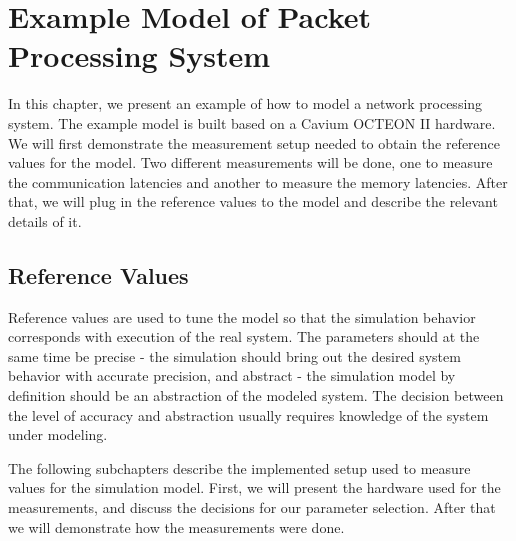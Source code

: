 \chapter{Example Model of Packet Processing System}
\label{chapter:example-simulation-model}

In this chapter, we present an example of how to model a network processing system. The example model is built based on a Cavium OCTEON II hardware. We will first demonstrate the measurement setup needed to obtain the reference values for the model. Two different measurements will be done, one to measure the communication latencies and another to measure the memory latencies. After that, we will plug in the reference values to the model and describe the relevant details of it.

\section{Reference Values}
\label{sec:reference-values}

 Reference values are used to tune the model so that the simulation behavior corresponds with execution of the real system. The parameters should at the same time be precise - the simulation should bring out the desired system behavior with accurate precision, and abstract - the simulation model by definition should be an abstraction of the modeled system. The decision between the level of accuracy and abstraction usually requires knowledge of the system under modeling.

The following subchapters describe the implemented setup used to measure values for the simulation model. First, we will present the hardware used for the measurements, and discuss the decisions for our parameter selection. After that we will demonstrate how the measurements were done.



